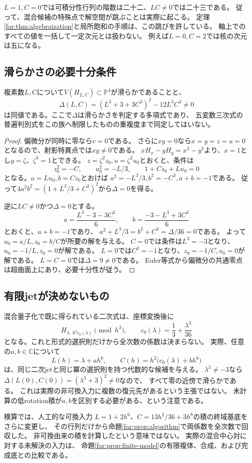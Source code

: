 $L=1,C=0$では可積分性行列の階数は二十二、$LC\ne0$では二十三である。
従って、混合候補の特殊点で解空間が跳ぶことは実際に起こる。
定理\ref{far:thm:algebraization}と局所飽和の手順は、この跳びを許している。
軸上でのすべての値を一括して一定次元とは扱わない。
例えば$L=0,C=2$では核の次元は五になる。

\subsection{滑らかさの必要十分条件}

\begin{proposition}[候補族の滑らかさ判別]\label{far:prop:discriminant}
複素数$L,C$について$V(H_{L,C})\subset\mathbb P^4$が滑らかであることと、
\begin{equation}\label{far:eq:discriminant}
 \Delta(L,C)=(L^3+3+3C^3)^2-12L^3C^3\ne0
\end{equation}
は同値である。ここで$\Delta$は滑らかさを判定する多項式であり、
五変数三次式の普遍判別式をこの族へ制限したものの重複度まで同定してはいない。
\end{proposition}
\begin{proof}
偏微分が同時に零なら$v=0$である。
さらに$xy=0$なら$x=y=z=u=0$となるので、射影特異点では$xy\ne0$である。
$xH_x-yH_y=x^3-y^3$より、$x=1$とし$y=\zeta$、$\zeta^3=1$とできる。
$z=\zeta^2z_0,u=\zeta^2u_0$とおくと、条件は
\[
 z_0^2=-C,\qquad u_0^2=-L/3,\qquad 1+Cz_0+Lu_0=0
\]
となる。$a=Lu_0,b=Cz_0$とおけば
$a^2=-L^3/3,b^2=-C^3,a+b=-1$である。
従って$4a^2b^2=(1+L^3/3+C^3)^2$から$\Delta=0$を得る。

逆に$LC\ne0$かつ$\Delta=0$とする。
\[
 a=\frac{L^3-3-3C^3}{6},\qquad
 b=\frac{-3-L^3+3C^3}{6}
\]
とおくと、$a+b=-1$であり、
$a^2+L^3/3=b^2+C^3=\Delta/36=0$である。
よって$u_0=a/L,z_0=b/C$が所要の解を与える。
$C=0$では条件は$L^3=-3$となり、$u_0=-1/L,z_0=0$が解である。
$L=0$では$C^3=-1$となり、$z_0=-1/C,u_0=0$が解である。
$L=C=0$では$\Delta=9\ne0$である。
Euler等式から偏微分の共通零点は超曲面上にあり、必要十分性が従う。
\end{proof}

\subsection{有限jetが決めないもの}

混合量子化で既に得られている二次式は、座標変換後に
\[
 H_{\lambda,\,h^2c_0(\lambda)}\pmod{h^3},
 \qquad c_0(\lambda)=\frac13+\frac{\lambda^3}{36}
\]
となる。これと形式的選択則だけから全次数の係数は決まらない。
実際、任意の$a,b\in\mathbb C$について
\[
 L(h)=\lambda+ah^6,\qquad
 C(h)=h^2\bigl(c_0(\lambda)+bh^6\bigr)
\]
は、同じ二次jetと同じ冪の選択則を持つ代数的な候補を与える。
$\lambda^3\ne-3$なら$\Delta(L(0),C(0))=(\lambda^3+3)^2\ne0$なので、
すべて零の近傍で滑らかである。
これは実際の非可換入力に複数の復元先があるという主張ではない。
未計算の低rotation積が$a,b$を区別する必要がある、という注意である。

検算では、人工的な可換入力
$L=1+2h^6$、$C=13h^2/36+3h^8$の積の終域基底をさらに変更し、
その行列だけから命題\ref{far:prop:algorithm}で両係数を全次数で回収した。
非可換由来の積を計算したという意味ではない。
実際の混合中心対に対する未解決の入力は、
命題\ref{far:prop:finite-model}の有限複体、合成、および完成底との比較である。
